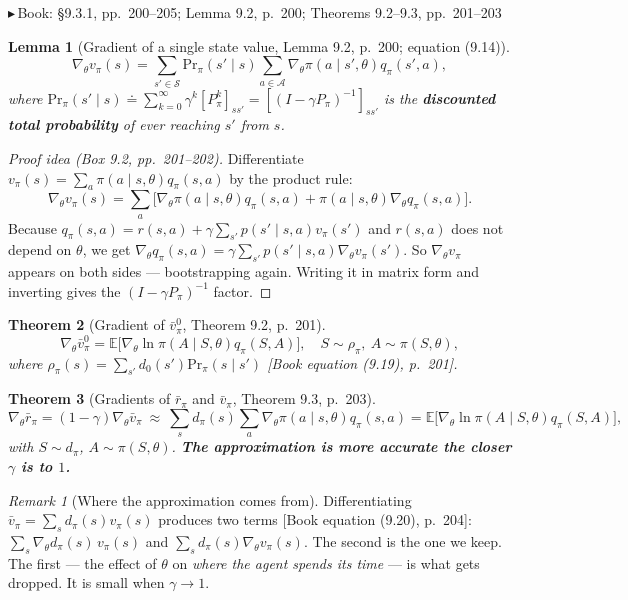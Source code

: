 \documentclass[11pt, letterpaper]{article}
\theoremstyle{runin}
\theoremstyle{runinplain}
\newtheorem{theorem}{Theorem}[section]
\newtheorem{lemma}[theorem]{Lemma}
\theoremstyle{remark}
\newtheorem*{remark}{Remark}
\newcommand{\E}{\mathbb{E}}
\newcommand{\Sspace}{\mathcal{S}}
\newcommand{\Aspace}{\mathcal{A}}
\newcommand{\bk}[1]{{\color{bookblue}\small$\blacktriangleright$\,\textsf{Book: #1}}}
\newcommand{\bkin}[1]{{\color{bookblue}\small[\textsf{Book #1}]}}
\begin{document}
\bk{\S9.3.1, pp.~200--205; Lemma 9.2, p.~200; Theorems 9.2--9.3, pp.~201--203}

\begin{lemma}[Gradient of a single state value, Lemma 9.2, p.~200; equation (9.14)]
\[
  \nabla_\theta v_\pi(s)=\sum_{s'\in\Sspace}\mathrm{Pr}_\pi(s'\mid s)
    \sum_{a\in\Aspace}\nabla_\theta\pi(a\mid s',\theta)q_\pi(s',a),
\]
where
$\mathrm{Pr}_\pi(s'\mid s)\doteq\sum_{k=0}^\infty\gamma^k[P_\pi^k]_{ss'}=[(I-\gamma P_\pi)^{-1}]_{ss'}$
is the \textbf{discounted total probability} of ever reaching $s'$ from $s$.
\end{lemma}

\begin{proof}[Proof idea (Box 9.2, pp.~201--202)]
Differentiate $v_\pi(s)=\sum_a\pi(a\mid s,\theta)q_\pi(s,a)$ by the product rule:
\[
  \nabla_\theta v_\pi(s)=\sum_a\bigl[\nabla_\theta\pi(a\mid s,\theta)q_\pi(s,a)
    +\pi(a\mid s,\theta)\nabla_\theta q_\pi(s,a)\bigr].
\]
Because $q_\pi(s,a)=r(s,a)+\gamma\sum_{s'}p(s'\mid s,a)v_\pi(s')$ and $r(s,a)$ does
not depend on $\theta$, we get
$\nabla_\theta q_\pi(s,a)=\gamma\sum_{s'}p(s'\mid s,a)\nabla_\theta v_\pi(s')$. So
$\nabla_\theta v_\pi$ appears on both sides --- bootstrapping again. Writing it in
matrix form and inverting gives the $(I-\gamma P_\pi)^{-1}$ factor.
\end{proof}

\begin{theorem}[Gradient of $\bar v_\pi^0$, Theorem 9.2, p.~201]
\[
  \nabla_\theta\bar v_\pi^0=\E\bigl[\nabla_\theta\ln\pi(A\mid S,\theta)q_\pi(S,A)\bigr],
  \quad S\sim\rho_\pi,\ A\sim\pi(S,\theta),
\]
where
$\rho_\pi(s)=\sum_{s'}d_0(s')\mathrm{Pr}_\pi(s\mid s')$ \bkin{equation (9.19), p.~201}.
\end{theorem}

\begin{theorem}[Gradients of $\bar r_\pi$ and $\bar v_\pi$, Theorem 9.3, p.~203]
\[
  \nabla_\theta\bar r_\pi=(1-\gamma)\nabla_\theta\bar v_\pi
  \ \approx\ \sum_s d_\pi(s)\sum_a\nabla_\theta\pi(a\mid s,\theta)q_\pi(s,a)
  =\E\bigl[\nabla_\theta\ln\pi(A\mid S,\theta)q_\pi(S,A)\bigr],
\]
with $S\sim d_\pi$, $A\sim\pi(S,\theta)$. \textbf{The approximation is more accurate
the closer $\gamma$ is to $1$.}
\end{theorem}

\begin{remark}[Where the approximation comes from]
Differentiating $\bar v_\pi=\sum_sd_\pi(s)v_\pi(s)$ produces two terms
\bkin{equation (9.20), p.~204}:
$\sum_s\nabla_\theta d_\pi(s)\,v_\pi(s)$ and $\sum_sd_\pi(s)\nabla_\theta v_\pi(s)$.
The second is the one we keep. The first --- the effect of $\theta$ on \emph{where the
agent spends its time} --- is what gets dropped. It is small when $\gamma\to1$.
\end{remark}
\end{document}
